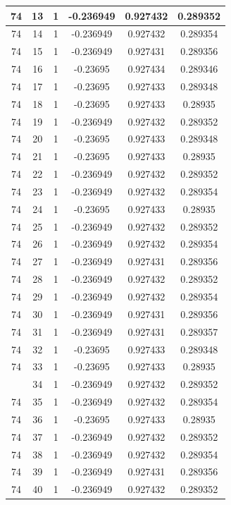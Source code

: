 \documentclass[12pt,a4paper]{article}
\numberwithin{equation}{section}
\numberwithin{figure}{section}
\numberwithin{table}{section}
\begin{document}
\begin{longtable}{|c|c|c|c|c|c|}
74 & 13 & 1 & -0.236949 & 0.927432 & 0.289352 \\ \hline
74 & 14 & 1 & -0.236949 & 0.927432 & 0.289354 \\ \hline
74 & 15 & 1 & -0.236949 & 0.927431 & 0.289356 \\ \hline
74 & 16 & 1 & -0.23695 & 0.927434 & 0.289346 \\ \hline
74 & 17 & 1 & -0.23695 & 0.927433 & 0.289348 \\ \hline
74 & 18 & 1 & -0.23695 & 0.927433 & 0.28935 \\ \hline
74 & 19 & 1 & -0.236949 & 0.927432 & 0.289352 \\ \hline
74 & 20 & 1 & -0.23695 & 0.927433 & 0.289348 \\ \hline
74 & 21 & 1 & -0.23695 & 0.927433 & 0.28935 \\ \hline
74 & 22 & 1 & -0.236949 & 0.927432 & 0.289352 \\ \hline
74 & 23 & 1 & -0.236949 & 0.927432 & 0.289354 \\ \hline
74 & 24 & 1 & -0.23695 & 0.927433 & 0.28935 \\ \hline
74 & 25 & 1 & -0.236949 & 0.927432 & 0.289352 \\ \hline
74 & 26 & 1 & -0.236949 & 0.927432 & 0.289354 \\ \hline
74 & 27 & 1 & -0.236949 & 0.927431 & 0.289356 \\ \hline
74 & 28 & 1 & -0.236949 & 0.927432 & 0.289352 \\ \hline
74 & 29 & 1 & -0.236949 & 0.927432 & 0.289354 \\ \hline
74 & 30 & 1 & -0.236949 & 0.927431 & 0.289356 \\ \hline
74 & 31 & 1 & -0.236949 & 0.927431 & 0.289357 \\ \hline
74 & 32 & 1 & -0.23695 & 0.927433 & 0.289348 \\ \hline
74 & 33 & 1 & -0.23695 & 0.927433 & 0.28935 \\ \hline
\pagebreak
74 & 34 & 1 & -0.236949 & 0.927432 & 0.289352 \\ \hline
74 & 35 & 1 & -0.236949 & 0.927432 & 0.289354 \\ \hline
74 & 36 & 1 & -0.23695 & 0.927433 & 0.28935 \\ \hline
74 & 37 & 1 & -0.236949 & 0.927432 & 0.289352 \\ \hline
74 & 38 & 1 & -0.236949 & 0.927432 & 0.289354 \\ \hline
74 & 39 & 1 & -0.236949 & 0.927431 & 0.289356 \\ \hline
74 & 40 & 1 & -0.236949 & 0.927432 & 0.289352 \\ \hline

\end{longtable}
\end{document}
